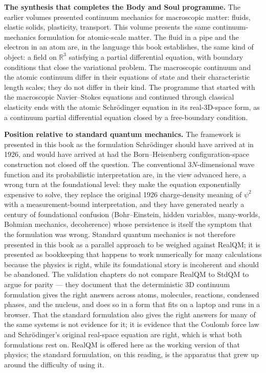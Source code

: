 \textbf{The synthesis that completes the Body and Soul programme.} The earlier volumes presented continuum mechanics for macroscopic matter: fluids, elastic solids, plasticity, transport. This volume presents the same continuum-mechanics formulation for atomic-scale matter. The fluid in a pipe and the electron in an atom are, in the language this book establishes, the same kind of object: a field on $\mathbb{R}^3$ satisfying a partial differential equation, with boundary conditions that close the variational problem. The macroscopic continuum and the atomic continuum differ in their equations of state and their characteristic length scales; they do not differ in their kind. The programme that started with the macroscopic Navier--Stokes equations and continued through classical elasticity ends with the atomic Schr\"odinger equation in its real-3D-space form, as a continuum partial differential equation closed by a free-boundary condition.

\textbf{Position relative to standard quantum mechanics.} The framework is presented in this book as the formulation Schr\"odinger should have arrived at in 1926, and would have arrived at had the Born--Heisenberg configuration-space construction not closed off the question. The conventional $3N$-dimensional wave function and its probabilistic interpretation are, in the view advanced here, a wrong turn at the foundational level: they make the equation exponentially expensive to solve, they replace the original 1926 charge-density meaning of $\psi^2$ with a measurement-bound interpretation, and they have generated nearly a century of foundational confusion (Bohr--Einstein, hidden variables, many-worlds, Bohmian mechanics, decoherence) whose persistence is itself the symptom that the formulation was wrong. Standard quantum mechanics is not therefore presented in this book as a parallel approach to be weighed against RealQM; it is presented as bookkeeping that happens to work numerically for many calculations because the physics is right, while its foundational story is incoherent and should be abandoned. The validation chapters do not compare RealQM to StdQM to argue for parity --- they document that the deterministic 3D continuum formulation gives the right answers across atoms, molecules, reactions, condensed phases, and the nucleus, and does so in a form that fits on a laptop and runs in a browser. That the standard formulation also gives the right answers for many of the same systems is not evidence for it; it is evidence that the Coulomb force law and Schr\"odinger's original real-space equation are right, which is what both formulations rest on. RealQM is offered here as the working version of that physics; the standard formulation, on this reading, is the apparatus that grew up around the difficulty of using it.

